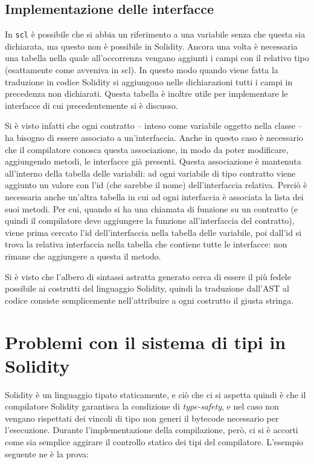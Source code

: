 \documentclass[12pt,a4paper]{report}
\begin{document}
\hypertarget{implementazione-delle-interfacce}{%
\subsection{Implementazione delle
interfacce}\label{implementazione-delle-interfacce}}

In \texttt{scl} è possibile che si abbia un riferimento a una variabile
senza che questa sia dichiarata, ma questo non è possibile in Solidity.
Ancora una volta è necessaria una tabella nella quale all'occorrenza
vengano aggiunti i campi con il relativo tipo (esattamente come avveniva
in scl). In questo modo quando viene fatta la traduzione in codice
Solidity si aggiungono nelle dichiarazioni tutti i campi in precedenza
non dichiarati. Questa tabella è inoltre utile per implementare le
interfacce di cui precedentemente si è discusso.

Si è visto infatti che ogni contratto -- inteso come variabile oggetto
nella classe -- ha bisogno di essere associato a un'interfaccia. Anche
in questo caso è necessario che il compilatore conosca questa
associazione, in modo da poter modificare, aggiungendo metodi, le
interfacce già presenti. Questa associazione è mantenuta all'interno
della tabella delle variabili: ad ogni variabile di tipo contratto viene
aggiunto un valore con l'id (che sarebbe il nome) dell'interfaccia
relativa. Perciò è necessaria anche un'altra tabella in cui ad ogni
interfaccia è associata la lista dei suoi metodi. Per cui, quando si ha
una chiamata di funzione su un contratto (e quindi il compilatore deve
aggiungere la funzione all'interfaccia del contratto), viene prima
cercato l'id dell'interfaccia nella tabella delle variabile, poi dall'id
si trova la relativa interfaccia nella tabella che contiene tutte le
interfacce: non rimane che aggiungere a questa il metodo.

Si è visto che l'albero di sintassi astratta generato cerca di essere il
più fedele possibile ai costrutti del linguaggio Solidity, quindi la
traduzione dall'AST al codice consiste semplicemente nell'attribuire a
ogni costrutto il giusta stringa.

\hypertarget{problemi-con-il-sistema-di-tipi-in-solidity}{%
\section{Problemi con il sistema di tipi in
Solidity}\label{problemi-con-il-sistema-di-tipi-in-solidity}}

Solidity è un linguaggio tipato staticamente, e ciò che ci si aspetta
quindi è che il compilatore Solidity garantisca la condizione di
\emph{type-safety}, e nel caso non vengano rispettati dei vincoli di
tipo non generi il bytecode necessario per l'esecuzione. Durante
l'implementazione della compilazione, però, ci si è accorti come sia
semplice aggirare il controllo statico dei tipi del compilatore.
L'esempio seguente ne è la prova:
\end{document}
